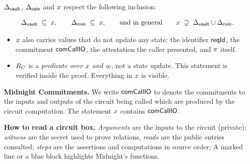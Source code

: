  $\Delta_{\mathsf{vault}}$, $\Delta_{\mathsf{coin}}$ and $x$  respect the following inclusion:

\[
  \Delta_{\mathsf{vault}} \;\subseteq\; x, \qquad \Delta_{\mathsf{coin}} \;\subseteq\; x,
  \qquad\text{and in general}\qquad x \;\supsetneq\; \Delta_{\mathsf{vault}} \cup \Delta_{\mathsf{coin}} .
\]
\begin{itemize}[nosep,leftmargin=1.4em,topsep=3pt]
\item $x$ also carries values that  do not update any state: the
      identifier $\mathsf{reqId}$,  the commitment $\mathsf{comCallIO}$, the
      attestation the caller presented, and $\pi$ itself.
\item $R_C$ is a \emph{predicate over $x$ and $w$}, not a state update. This statement is verified inside the proof. Everything in $x$ is visible.
\end{itemize}

\medskip
\noindent
\textbf{Midnight   Commitments.} We write $\mathsf{comCallIO}$ to denote the commitments  to the inputs and outputs of the circuit being called which are produced by the circuit computation.
The statement $x$ contains $\mathsf{comCallIO}$.


\medskip
\noindent\textbf{How to read a circuit box.} \emph{Arguments} are the  inputs to the circuit (private);
\emph{witness} are the secret used to prove relations,   \emph{reads} are the public entries consulted; \emph{steps}
are the assertions and computations in source order;  A
\bluedot marked line or a blue block  highlights  Midnight's functions.





